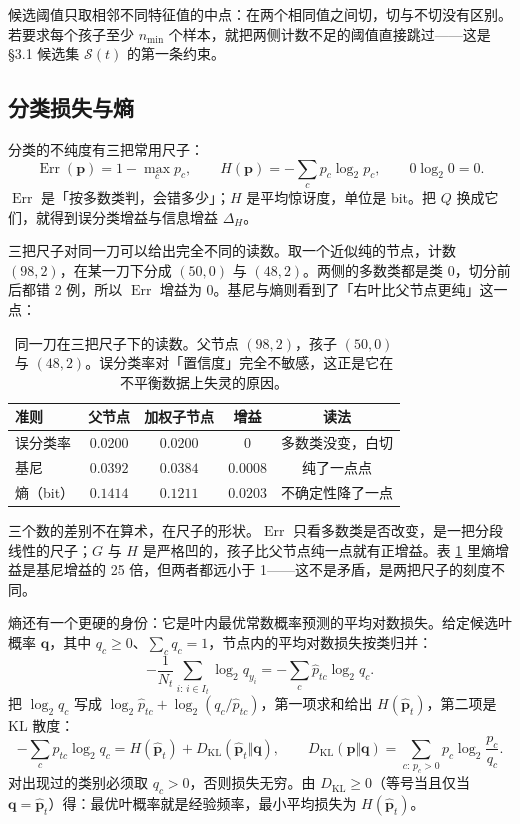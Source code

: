 \documentclass[11pt,a4paper,fontset=windows,zihao=-4]{ctexart}
\newcommand{\bp}{\mathbf{p}}
\newcommand{\bq}{\mathbf{q}}
\DeclareMathOperator{\Err}{Err}
\newcommand{\Scal}{\mathcal{S}}
\newcommand{\tabhead}{\sffamily\bfseries\color{navy}}
\begin{document}
候选阈值只取相邻不同特征值的中点：在两个相同值之间切，切与不切没有区别。若要求每个孩子至少 $n_{\min}$ 个样本，就把两侧计数不足的阈值直接跳过——这是 §3.1 候选集 $\Scal(t)$ 的第一条约束。

\subsection{分类损失与熵}

分类的不纯度有三把常用尺子：
\begin{equation}
  \Err(\bp)=1-\max_c p_c,\qquad
  H(\bp)=-\sum_c p_c\log_2 p_c,\qquad 0\log_2 0=0 .
  \label{eq:errh}
\end{equation}
$\Err$ 是「按多数类判，会错多少」；$H$ 是平均惊讶度，单位是 bit。把 $Q$ 换成它们，就得到误分类增益与信息增益 $\Delta_H$。

三把尺子对同一刀可以给出完全不同的读数。取一个近似纯的节点，计数 $(98,2)$，在某一刀下分成 $(50,0)$ 与 $(48,2)$。两侧的多数类都是类 0，切分前后都错 2 例，所以 $\Err$ 增益为 $0$。基尼与熵则看到了「右叶比父节点更纯」这一点：

\begin{table}[htbp]
\centering
\small
\begin{tabular}{@{}lcccc@{}}
\toprule
\rowcolor{navy!7}
\tabhead 准则 & \tabhead 父节点 & \tabhead 加权子节点 & \tabhead 增益 & \tabhead 读法\\
\midrule
误分类率 & $0.0200$ & $0.0200$ & $0$ & 多数类没变，白切\\
基尼 & $0.0392$ & $0.0384$ & $0.0008$ & 纯了一点点\\
熵（bit） & $0.1414$ & $0.1211$ & $0.0203$ & 不确定性降了一点\\
\bottomrule
\end{tabular}
\caption{同一刀在三把尺子下的读数。父节点 $(98,2)$，孩子 $(50,0)$ 与 $(48,2)$。误分类率对「置信度」完全不敏感，这正是它在不平衡数据上失灵的原因。}
\label{tab:threemeasures}
\end{table}

三个数的差别不在算术，在尺子的形状。$\Err$ 只看多数类是否改变，是一把分段线性的尺子；$G$ 与 $H$ 是严格凹的，孩子比父节点纯一点就有正增益。表 \ref{tab:threemeasures} 里熵增益是基尼增益的 25 倍，但两者都远小于 1——这不是矛盾，是两把尺子的刻度不同。

熵还有一个更硬的身份：它是叶内最优常数概率预测的平均对数损失。给定候选叶概率 $\bq$，其中 $q_c\ge0$、$\sum_cq_c=1$，节点内的平均对数损失按类归并：
\[
  -\frac1{N_t}\sum_{i:\,i\in I_t}\log_2 q_{y_i}
  =-\sum_c\widehat p_{tc}\log_2 q_c .
\]
把 $\log_2 q_c$ 写成 $\log_2\widehat p_{tc}+\log_2(q_c/\widehat p_{tc})$，第一项求和给出 $H(\widehat{\bp}_t)$，第二项是 KL 散度：
\begin{equation}
  -\sum_c\widehat p_{tc}\log_2 q_c
  =H(\widehat{\bp}_t)+D_{\mathrm{KL}}(\widehat{\bp}_t\Vert\bq),
  \qquad
  D_{\mathrm{KL}}(\bp\Vert\bq)=\sum_{c:\,p_c>0}p_c\log_2\frac{p_c}{q_c}.
  \label{eq:kl}
\end{equation}
对出现过的类别必须取 $q_c>0$，否则损失无穷。由 $D_{\mathrm{KL}}\ge0$（等号当且仅当 $\bq=\widehat{\bp}_t$）得：最优叶概率就是经验频率，最小平均损失为 $H(\widehat{\bp}_t)$。
\end{document}
